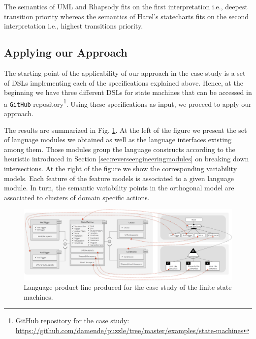 The semantics of UML and Rhapsody fits on the first interpretation i.e., deepest transition priority whereas the semantics of Harel's statecharts fits on the second interpretation i.e., highest transitions priority.


\subsection{Applying our Approach}

The starting point of the applicability of our approach in the case study is a set of DSLs implementing each of the specifications explained above. Hence, at the beginning we have three different DSLs for state machines that can be accessed in a \texttt{GitHub} repository\footnote{GitHub repository for the case study: \url{https://github.com/damende/puzzle/tree/master/examples/state-machines}}. Using these specifications as input, we proceed to apply our approach.

The results are summarized in Fig. \ref{fig:results-casestudy}. At the left of the figure we present the set of language modules we obtained as well as the language interfaces existing among them. Those modules group the language constructs according to the heuristic introduced in Section \ref{sec:reverseengineeringmodules} on breaking down intersections. At the right of the figure we show the corresponding variability models. Each feature of the feature models is associated to a given language module. In turn, the semantic variability points in the orthogonal model are associated to clusters of domain specific actions.


\begin{figure}
\centering
\includegraphics[width=1\linewidth]{images/results-casestudy.png}
\caption{Language product line produced for the case study of the finite state machines. }
\label{fig:results-casestudy}
\end{figure}

